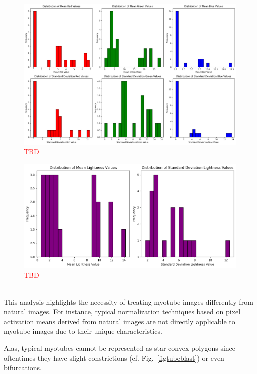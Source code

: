 \begin{figure}
	\centering
	\includegraphics[width=\textwidth]{"images/pixel_distribution_plots_rgb.png"}
	\caption[TBD]{\textcolor{red}{TBD}}
	\label{fig2}
\end{figure}
\begin{figure}
	\centering
	\includegraphics[width=\textwidth]{"images/pixel_distribution_plots_hsl.png"}
	\caption[TBD]{\textcolor{red}{TBD}}
	\label{fig3}
\end{figure}
\ \\
This analysis highlights the necessity of treating myotube images differently from natural images. For instance, typical normalization techniques based on pixel activation means derived from natural images are not directly applicable to myotube images due to their unique characteristics.

Alas, typical myotubes cannot be represented as star-convex polygons since oftentimes they have slight constrictions (cf. Fig.~\ref{figtubeblast}) or even bifurcations.

